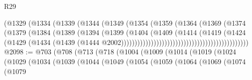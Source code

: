 \begin{lexlean}{R29}
\begin{coremodule}
                                                  (@1329
                                                    (@1334
                                                      (@1339
                                                        (@1344
                                                          (@1349
                                                            (@1354
                                                              (@1359
                                                                (@1364
                                                                  (@1369
                                                                    (@1374
                                                                      (@1379
                                                                        (@1384
                                                                          (@1389
                                                                            (@1394
                                                                              (@1399
                                                                                (@1404
                                                                                  (@1409
                                                                                    (@1414
                                                                                      (@1419
                                                                                        (@1424
                                                                                          (@1429
                                                                                            (@1434
                                                                                              (@1439
                                                                                                (@1444
                                                                                                  @2002)))))))))))))))))))))))))))))))))))))))))))))))
@2098 := @703
    (@708
      (@713
        (@718
          (@1004
            (@1009
              (@1014
                (@1019
                  (@1024
                    (@1029
                      (@1034
                        (@1039
                          (@1044
                            (@1049
                              (@1054
                                (@1059
                                  (@1064
                                    (@1069
                                      (@1074
                                        (@1079

\end{coremodule}
\end{lexlean}
